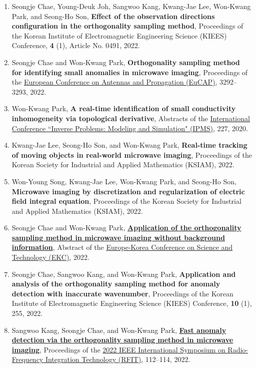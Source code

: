 \documentclass[10pt,A4]{article}
\begin{document}
\begin{enumerate}
\item\label{C-KIEES2022B} Seongje Chae, Young-Deuk Joh, Sangwoo Kang, Kwang-Jae Lee, Won-Kwang Park, and Seong-Ho Son, \textbf{Effect of the observation directions configuration in the orthogonality sampling method}, Proceedings of the Korean Institute of Electromagnetic Engineering Science (KIEES) Conference, \textbf{4} (1), Article No. 0491, 2022.
\item\label{C-EUCAP2022} Seongje Chae and Won-Kwang Park, \textbf{Orthogonality sampling method for identifying small anomalies in microwave imaging}, Proceedings of the \href{https://www.eucap.org/}{ European Conference on Antennas and Propagation (EuCAP)}, 3292--3293, 2022.
\item\label{C-IPMS2022} Won-Kwang Park, \textbf{A real-time identification of small conductivity inhomogeneity via topological derivative}, Abstracts of the \href{https://www.ipms-conference.org/ipms2022/index.php}{ International Conference ``Inverse Problems: Modeling and Simulation" (IPMS)}, 227, 2020.
\item\label{C-KSIAM2022A} Kwang-Jae Lee, Seong-Ho Son, and Won-Kwang Park, \textbf{Real-time tracking of moving objects in real-world microwave imaging}, Proceedings of the Korean Society for Industrial and Applied Mathematics (KSIAM), 2022.
\item\label{C-KSIAM2022B} Won-Young Song, Kwang-Jae Lee, Won-Kwang Park, and Seong-Ho Son, \textbf{Microwave imaging by discretization and regularization of electric field integral equation}, Proceedings of the Korean Society for Industrial and Applied Mathematics (KSIAM), 2022.
\item\label{C-EKC2022} Seongje Chae and Won-Kwang Park, \href{https://registration.ekc2022.org/access/showAbstract/196/084b6fbb10729ed4da8c3d3f5a3ae7c9}{\textbf{Application of the orthogonality sampling method in microwave imaging without background information}}, Abstract of the \href{https://www.ekc2022.org}{Europe-Korea Conference on Science and Technology (EKC)}, 2022.
\item\label{C-KIEES2022C} Seongje Chae, Sangwoo Kang, and Won-Kwang Park, \textbf{Application and analysis of the orthogonality sampling method for anomaly detection with inaccurate wavenumber}, Proceedings of the Korean Institute of Electromagnetic Engineering Science (KIEES) Conference, \textbf{10} (1), 255, 2022.
\item\label{C-RFIT2022} Sangwoo Kang, Seongje Chae, and Won-Kwang Park, \href{https://doi.org/10.1109/RFIT54256.2022.9882350}{\textbf{Fast anomaly detection via the orthogonality sampling method in microwave imaging}}, Proceedings of the \href{http://rfit2022.org}{2022 IEEE International Symposium on Radio-Frequency Integration Technology (RFIT)}, 112--114, 2022.

\end{enumerate}
\end{document}
